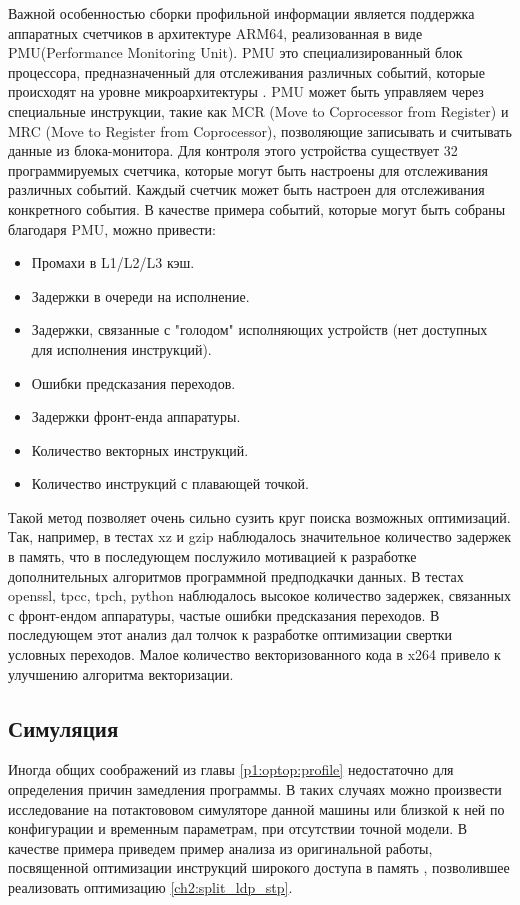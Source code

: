 Важной особенностью сборки профильной информации является поддержка аппаратных счетчиков в архитектуре ARM64, реализованная в виде PMU(Performance Monitoring Unit). PMU это специализированный блок процессора, предназначенный для отслеживания различных событий, которые происходят на уровне микроархитектуры \cite{hansen2020examining}. PMU может быть управляем через специальные инструкции, такие как MCR (Move to Coprocessor from Register) и MRC (Move to Register from Coprocessor), позволяющие записывать и считывать данные из блока-монитора. Для контроля этого устройства существует 32 программируемых счетчика, которые могут быть настроены для отслеживания различных событий. Каждый счетчик может быть настроен для отслеживания конкретного события. В качестве примера событий, которые могут быть собраны благодаря PMU, можно привести:
\begin{itemize}
	\item Промахи в L1/L2/L3 кэш.
	\item Задержки в очереди на исполнение.
	\item Задержки, связанные с "голодом" исполняющих устройств (нет доступных для исполнения инструкций).
	\item Ошибки предсказания переходов.
	\item Задержки фронт-енда аппаратуры.
	\item Количество векторных инструкций.
	\item Количество инструкций с плавающей точкой.
\end{itemize}


Такой метод позволяет очень сильно сузить круг поиска возможных оптимизаций. Так, например, в тестах xz и gzip наблюдалось значительное количество задержек в память, что в последующем послужило мотивацией к разработке дополнительных алгоритмов программной предподкачки данных. В тестах openssl, tpcc, tpch, python наблюдалось высокое количество задержек, связанных с фронт-ендом аппаратуры, частые ошибки предсказания переходов. В последующем этот анализ дал толчок к разработке оптимизации свертки условных переходов. Малое количество векторизованного кода в x264 привело к улучшению алгоритма векторизации.


\subsection {Симуляция}\label{p1:optop:sim}

Иногда общих соображений из главы \ref{p1:optop:profile} недостаточно для определения причин замедления программы. В таких случаях можно произвести исследование на потактововом симуляторе данной машины или близкой к ней по конфигурации и временным параметрам, при отсутствии точной модели. В качестве примера приведем пример анализа из оригинальной работы, посвященной оптимизации инструкций широкого доступа в память \cite{chernonog2024widemem}, позволившее реализовать оптимизацию \ref{ch2:split_ldp_stp}.

